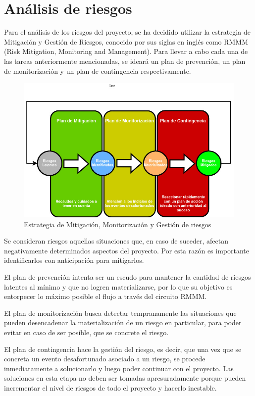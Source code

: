 \chapter{Análisis de riesgos}

Para el análisis de los riesgos del proyecto, se ha decidido utilizar la estrategia de Mitigación y Gestión de Riesgos, conocido por sus siglas en inglés como RMMM (Risk Mitigation, Monitoring and Management). Para llevar a cabo cada una de las tareas anteriormente mencionadas, se ideará un plan de prevención, un plan de monitorización y un plan de contingencia respectivamente.

\begin{figure}[H]
   \centering
   \includegraphics[trim={0 0 0 2cm}, clip, width=0.8\linewidth]{images/rmmm.jpg}
   \caption{Estrategia de Mitigación, Monitorización y Gestión de riesgos}
   \label{fig:rmmm}
\end{figure}

Se consideran riesgos aquellas situaciones que, en caso de suceder, afectan negativamente determinados aspectos del proyecto. Por esta razón es importante identificarlos con anticipación para mitigarlos.

El plan de prevención intenta ser un escudo para mantener la cantidad de riesgos latentes al mínimo y que no logren materializarse, por lo que su objetivo es entorpecer lo máximo posible el flujo a través del circuito RMMM.

El plan de monitorización busca detectar tempranamente las situaciones que pueden desencadenar la materialización de un riesgo en particular, para poder evitar en caso de ser posible, que se concrete el riesgo.

El plan de contingencia hace la gestión del riesgo, es decir, que una vez que se concreta un evento desafortunado asociado a un riesgo, se procede inmediatamente a solucionarlo y luego poder continuar con el proyecto. Las soluciones en esta etapa no deben ser tomadas apresuradamente porque pueden incrementar el nivel de riesgos de todo el proyecto y hacerlo inestable. \cite{rmmm}

